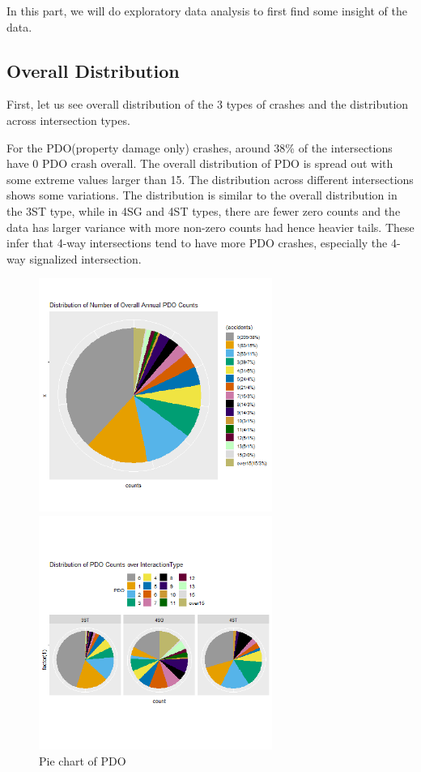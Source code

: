 \documentclass[11pt]{scrartcl} %
\begin{document}
In this part, we will do exploratory data analysis to first find some insight of the data.

\subsection{Overall Distribution}

First, let us see overall distribution of the 3 types of crashes and the distribution across intersection types.

For the PDO(property damage only) crashes, around 38\% of the intersections have 0 PDO crash overall. The overall distribution of PDO is spread out with some extreme values larger than 15. The distribution across different intersections shows some variations. The distribution is similar to the overall distribution in the 3ST type, while in 4SG and 4ST types, there are fewer zero counts and the data has larger variance with more non-zero counts had hence heavier tails. These infer that 4-way intersections tend to have more PDO crashes, especially the 4-way signalized intersection.

\begin{figure}[H]
\begin{minipage}[t]{0.5\linewidth}
\centering
\includegraphics[width=3in]{image/p111.png}
\small
\end{minipage}
\begin{minipage}[t]{0.5\linewidth}
\centering
\includegraphics[width=3in]{image/p121_PDO.png}
\small
\end{minipage}
\caption{Pie chart of PDO}
\end{figure}
\end{document}
